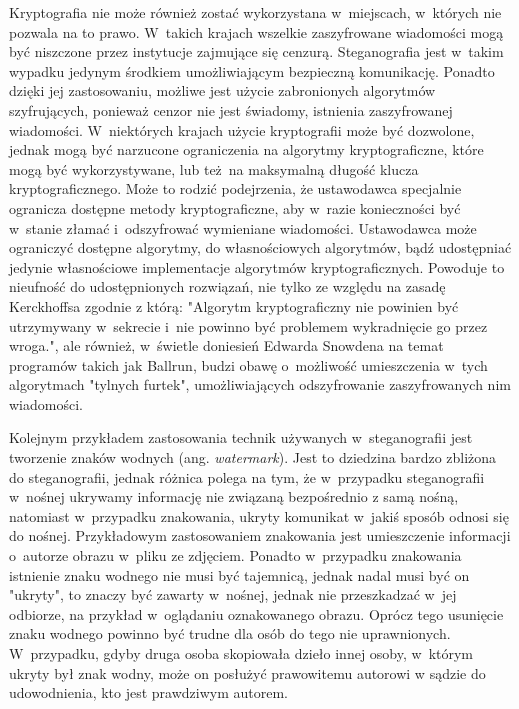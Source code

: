 \documentclass[a4paper, twoside, 12pt]{report}
\begin{document}
        Kryptografia nie może również zostać wykorzystana w~miejscach, w~których
        nie pozwala na to prawo\cite{CRYPTOGRAFYLAW}. W~takich krajach wszelkie
        zaszyfrowane wiadomości mogą być niszczone przez instytucje zajmujące się
        cenzurą. Steganografia jest w~takim
        wypadku jedynym środkiem umożliwiającym bezpieczną komunikację. Ponadto
        dzięki jej zastosowaniu, możliwe jest użycie zabronionych algorytmów szyfrujących,
        ponieważ cenzor nie jest świadomy, istnienia zaszyfrowanej wiadomości.
        W~niektórych krajach użycie kryptografii
        może być dozwolone, jednak mogą być narzucone ograniczenia na algorytmy
        kryptograficzne, które mogą być wykorzystywane, lub też na maksymalną
        długość klucza kryptograficznego. Może to rodzić podejrzenia, że ustawodawca
        specjalnie ogranicza dostępne metody kryptograficzne, aby w~razie konieczności
        być w~stanie złamać i~odszyfrować wymieniane wiadomości. Ustawodawca
        może ograniczyć dostępne algorytmy, do własnościowych algorytmów, bądź
        udostępniać jedynie własnościowe implementacje algorytmów kryptograficznych.
        Powoduje to nieufność do udostępnionych rozwiązań, nie tylko ze względu
        na zasadę Kerckhoffsa zgodnie z którą:
        "Algorytm kryptograficzny nie powinien być utrzymywany w~sekrecie i~nie powinno
        być problemem wykradnięcie go przez wroga."\cite{KERCKHOS}, ale również,
        w~świetle doniesień Edwarda Snowdena na temat programów takich jak
        Ballrun\cite{WIKI:BALLRUN}, budzi obawę o~możliwość umieszczenia w~tych
        algorytmach "tylnych furtek", umożliwiających odszyfrowanie zaszyfrowanych
        nim wiadomości.

        Kolejnym przykładem zastosowania technik używanych w~steganografii jest
        tworzenie znaków wodnych (ang. \emph{watermark}). Jest to dziedzina bardzo zbliżona do steganografii,
        jednak różnica polega na tym, że w~przypadku steganografii w~nośnej ukrywamy
        informację nie związaną bezpośrednio z samą nośną, natomiast w~przypadku znakowania,
        ukryty komunikat w~jakiś sposób odnosi się do nośnej. Przykładowym zastosowaniem
        znakowania jest umieszczenie informacji o~autorze obrazu w~pliku ze zdjęciem.
        Ponadto w~przypadku znakowania istnienie znaku wodnego nie musi być tajemnicą,
        jednak nadal musi być on "ukryty", to znaczy być zawarty w~nośnej, jednak
        nie przeszkadzać w~jej odbiorze, na przykład w~oglądaniu oznakowanego obrazu.
        Oprócz tego usunięcie znaku wodnego powinno być trudne dla osób do tego nie
        uprawnionych. W~przypadku, gdyby druga osoba skopiowała dzieło innej osoby,
        w~którym ukryty był znak wodny, może on posłużyć prawowitemu autorowi w
        sądzie do udowodnienia, kto jest prawdziwym autorem.
\end{document}
